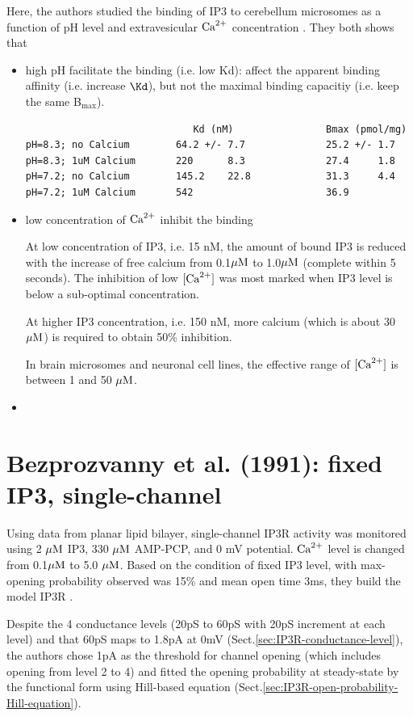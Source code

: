 Here, the authors studied the binding of IP3 to cerebellum microsomes as a
function of pH level and extravesicular ${\text{Ca}^{2+}}$ concentration
\citep{joseph1989ip3}.
They both shows that
\begin{itemize}
  \item high pH facilitate the binding (i.e. low Kd): affect the apparent
  binding affinity (i.e. increase $\Kd$), but not the maximal binding capacitiy
  (i.e. keep the same B$_\max$).

\begin{verbatim}
                             Kd (nM)                Bmax (pmol/mg)
pH=8.3; no Calcium        64.2 +/- 7.7              25.2 +/- 1.7
pH=8.3; 1uM Calcium       220      8.3              27.4     1.8
pH=7.2; no Calcium        145.2    22.8             31.3     4.4
pH=7.2; 1uM Calcium       542                       36.9
\end{verbatim}

  \item low concentration of ${\text{Ca}^{2+}}$ inhibit the binding

At low concentration of IP3, i.e. 15 nM, the amount of bound IP3 is reduced with
the increase of free calcium from 0.1${\mu\text{M}}$ to 1.0${\mu\text{M}}$ (complete within
5 seconds). The inhibition of low $[{\text{Ca}^{2+}}]$ was most marked when IP3 level is
below a sub-optimal concentration.

At higher IP3 concentration, i.e. 150 nM, more calcium (which is about
30${\mu\text{M}}$) is required to obtain 50\% inhibition.

In brain microsomes and neuronal cell lines, the effective range of $[{\text{Ca}^{2+}}]$ is
between 1 and 50 ${\mu\text{M}}$.

  \item 
\end{itemize}



\section{Bezprozvanny et al. (1991): fixed IP3, single-channel}
\label{sec:IP3R-opening-prob-Bezprozvanny1991}

Using data from planar lipid bilayer, single-channel IP3R activity was monitored
using 2 ${\mu\text{M}}$ IP3, 330 ${\mu\text{M}}$ AMP-PCP, and 0 mV potential. ${\text{Ca}^{2+}}$ level is
changed from 0.1${\mu\text{M}}$ to 5.0 ${\mu\text{M}}$. Based on the condition of fixed IP3 level,
with max-opening probability observed was 15\% and mean open time 3ms, they
build the model IP3R .

Despite the 4 conductance levels (20pS to 60pS with 20pS increment at each
level) and that 60pS maps to 1.8pA at 0mV
(Sect.\ref{sec:IP3R-conductance-level}), the authors chose 1pA as the threshold
for channel opening (which includes opening from level 2 to 4)
\citep{bezprozvanny1991ip3r} and fitted the opening probability at steady-state
by the functional form using Hill-based equation
(Sect.\ref{sec:IP3R-open-probability-Hill-equation}).



